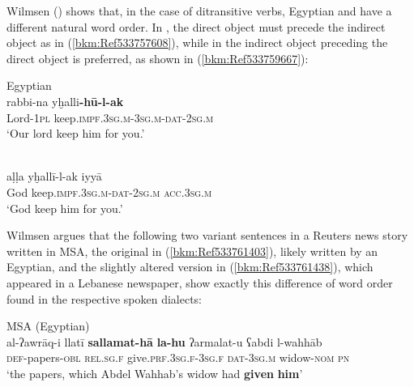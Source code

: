 \documentclass[output=paper]{langsci/langscibook}
\begin{document}
Wilmsen (\citeyear[104]{Wilmsen2010}) shows that, in the case of ditransitive verbs, Egyptian and  have a different natural {word order}. In , the direct object must precede the indirect object as in (\ref{bkm:Ref533757608}), while in   the indirect object preceding the direct object is preferred, as shown in (\ref{bkm:Ref533759667}):

\ea
\label{bkm:Ref533757608}Egyptian\\
\gll rabbi-na yḫalli\textbf{{}-hū-l-ak}\\
     Lord-\textsc{1pl} keep\textsc{.impf.3sg.m}{}-3\textsc{sg.m-dat-2sg.m}\\
\glt ‘Our lord keep him for you.’
\z

\ea\label{bkm:Ref533759667}\\
\gll aḷḷa yḫallī-l-ak iyyā\\
     God keep\textsc{.impf.3sg.m-dat-2sg.m} \textsc{acc.}3\textsc{sg.m} \\
\glt ‘God keep him for you.’\z

Wilmsen argues that the following two variant sentences in a Reuters news story written in MSA, the original in (\ref{bkm:Ref533761403}), likely written by an Egyptian, and the slightly altered version in (\ref{bkm:Ref533761438}), which appeared in a Lebanese newspaper, show exactly this difference of {word order} found in the respective spoken dialects:

\ea
\label{bkm:Ref533761403}MSA (Egyptian)\\
\gll al-ʔawrāq-i llatī \textbf{sallamat-hā} \textbf{la-hu} ʔarmalat-u ʕabdi l-wahhāb\\
     \textsc{def}{}-papers-\textsc{obl} \textsc{rel.sg.f} give.\textsc{prf.3sg.f-3sg.f} \textsc{dat-3sg.m} widow-\textsc{nom} \textsc{pn}\\
     \glt ‘the papers, which Abdel Wahhab’s widow had \textbf{given} \textbf{him}’
\z

\end{document}
